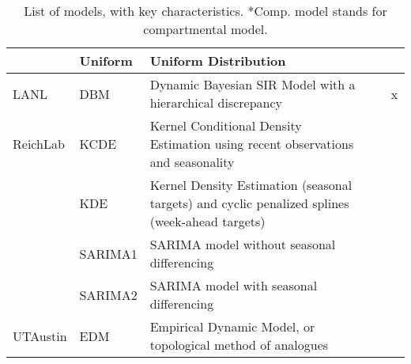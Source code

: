 \begin{table}
\begin{tabular}{p{1.69cm} l p{7.5cm}  p{1.70cm}  p{1.7cm}}
~        & Uniform            & Uniform Distribution  & ~             & ~                   \\ 
\hline
LANL     & DBM                & Dynamic Bayesian SIR Model with a hierarchical discrepancy & ~             & x                   \\ 
\hline
ReichLab & KCDE               & Kernel Conditional Density Estimation using recent observations and seasonality  & ~             & ~                   \\ 
~        & KDE                & Kernel Density Estimation (seasonal targets) and cyclic penalized splines (week-ahead targets)  & ~             & ~                   \\ 
~        & SARIMA1            & SARIMA model without seasonal differencing & ~             & ~                   \\ 
~        & SARIMA2            & SARIMA model with seasonal differencing & ~             & ~                   \\ 
\hline
UTAustin & EDM                & Empirical Dynamic Model, or topological method of analogues & ~             & ~                   \\ 
\end{tabular}
\caption{List of models, with key characteristics. *Comp. model stands for compartmental model.}
\label{tab:model-list}
\end{table}